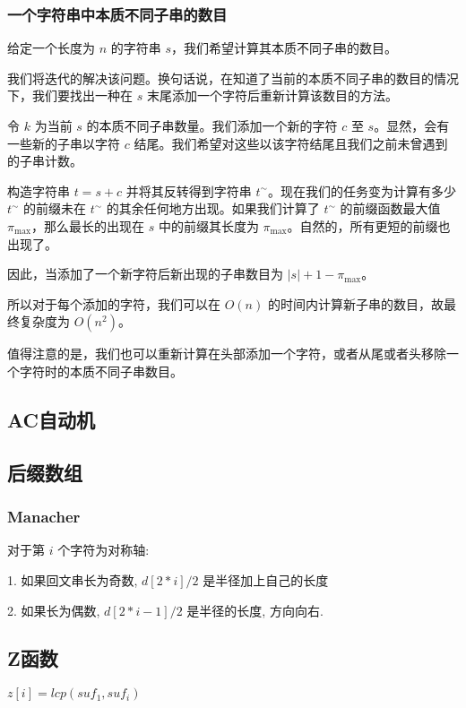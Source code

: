 \documentclass[a4paper]{article}
\begin{document}
\subsubsection{一个字符串中本质不同子串的数目}
给定一个长度为 $n$ 的字符串 $s$，我们希望计算其本质不同子串的数目。

我们将迭代的解决该问题。换句话说，在知道了当前的本质不同子串的数目的情况下，我们要找出一种在 $s$ 末尾添加一个字符后重新计算该数目的方法。

令 $k$ 为当前 $s$ 的本质不同子串数量。我们添加一个新的字符 $c$ 至 $s$。显然，会有一些新的子串以字符 $c$ 结尾。我们希望对这些以该字符结尾且我们之前未曾遇到的子串计数。

构造字符串 $t = s + c$ 并将其反转得到字符串 $t^{\sim}$。现在我们的任务变为计算有多少 $t^{\sim}$ 的前缀未在 $t^{\sim}$ 的其余任何地方出现。如果我们计算了 $t^{\sim}$ 的前缀函数最大值 $\pi_{\max}$，那么最长的出现在 $s$ 中的前缀其长度为 $\pi_{\max}$。自然的，所有更短的前缀也出现了。

因此，当添加了一个新字符后新出现的子串数目为 $|s| + 1 - \pi_{\max}$。

所以对于每个添加的字符，我们可以在 $O(n)$ 的时间内计算新子串的数目，故最终复杂度为 $O(n^2)$。

值得注意的是，我们也可以重新计算在头部添加一个字符，或者从尾或者头移除一个字符时的本质不同子串数目。

\subsection{AC自动机}


\subsection{后缀数组}


\subsubsection{Manacher}
对于第 $i$ 个字符为对称轴: 

1. 如果回文串长为奇数, $d[2 * i]/2$ 是半径加上自己的长度

2. 如果长为偶数, $d[2 * i -1]/2$ 是半径的长度, 方向向右. 


\subsection{Z函数}
$z[i]=lcp(suf_1, suf_i)$

\end{document}

